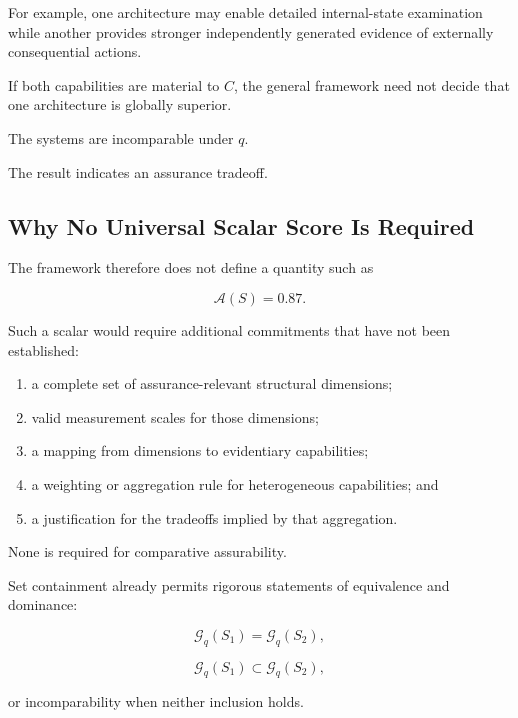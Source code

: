 For example, one architecture may enable detailed internal-state examination
while another provides stronger independently generated evidence of externally consequential actions.

If both capabilities are material to \(C\),
the general framework need not decide that one architecture is globally superior.

The systems are incomparable under \(q\).

The result indicates an assurance tradeoff.

\subsection{Why No Universal Scalar Score Is Required}
\label{aa.subsec.no-scalar}

The framework therefore does not define a quantity such as

\begin{equation}
  \mathcal{A}(S)=0.87.
\end{equation}

Such a scalar would require additional commitments that have not been established:

\begin{enumerate}
  \item a complete set of assurance-relevant structural dimensions;
  \item valid measurement scales for those dimensions;
  \item a mapping from dimensions to evidentiary capabilities;
  \item a weighting or aggregation rule for heterogeneous capabilities; and
  \item a justification for the tradeoffs implied by that aggregation.
\end{enumerate}

None is required for comparative assurability.

Set containment already permits rigorous statements of equivalence and dominance:

\begin{equation}
  \mathcal{G}_q(S_1)
  =
  \mathcal{G}_q(S_2),
\end{equation}

\begin{equation}
  \mathcal{G}_q(S_1)
  \subset
  \mathcal{G}_q(S_2),
\end{equation}

or incomparability when neither inclusion holds.

